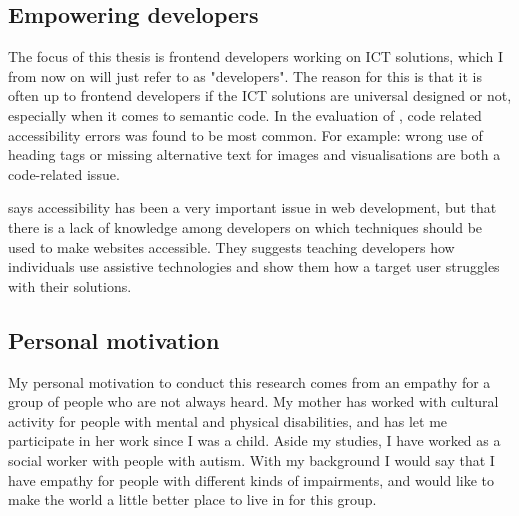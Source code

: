 

\subsection{Empowering developers}
The focus of this thesis is frontend developers working on ICT solutions, which I from now on will just refer to as "developers". The reason for this is that it is often up to frontend developers if the ICT solutions are universal designed or not, especially when it comes to semantic code. In the evaluation of \textcite{difi_digitale_2015}, code related accessibility errors was found to be most common. For example: wrong use of heading tags or missing alternative text for images and visualisations are both a code-related issue.


\textcite{Freire2008} says accessibility has been a very important issue in web development, but that there is a lack of knowledge among developers on which techniques should be used to make websites accessible. They suggests teaching developers how individuals use assistive technologies and show them how a target user struggles with their solutions.

\subsection{Personal motivation}
My personal motivation to conduct this research comes from an empathy for a group of people who are not always heard. My mother has worked with cultural activity for people with mental and physical disabilities, and has let me participate in her work since I was a child. Aside my studies, I have worked as a social worker with people with autism. With my background I would say that I have empathy for people with different kinds of impairments, and would like to make the world a little better place to live in for this group. 

